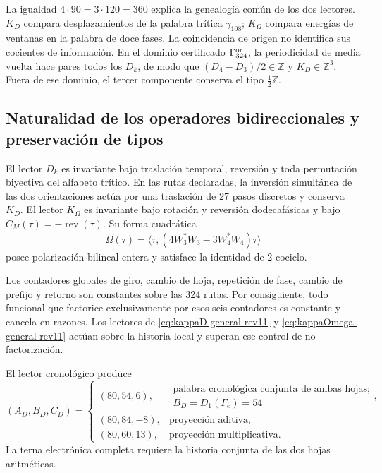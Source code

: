 La igualdad \(4\cdot90=3\cdot120=360\) explica la genealogía común de
los dos lectores. \(K_D\) compara desplazamientos de la palabra trítica
\(\gamma_{108}\);
\(K_\Omega\) compara energías de ventanas en la palabra de doce fases. La
coincidencia de origen no identifica sus cocientes de información.
En el dominio certificado \(\Gamma_{324}^{\rm or}\), la periodicidad de
media vuelta hace pares todos los \(D_k\), de modo que
\((D_4-D_3)/2\in\mathbb Z\) y \(K_D\in\mathbb Z^3\). Fuera de ese dominio,
el tercer componente conserva el tipo \(\tfrac12\mathbb Z\).

\subsection{Naturalidad de los operadores bidireccionales y preservación de tipos}

El lector \(D_k\) es invariante bajo traslación temporal, reversión y toda
permutación biyectiva del alfabeto trítico. En las rutas declaradas, la
inversión simultánea de las dos orientaciones actúa por una traslación de
27 pasos discretos y conserva \(K_D\). El lector \(K_\Omega\) es invariante bajo
rotación y reversión dodecafásicas y bajo
\(C_M(\tau)=-\operatorname{rev}(\tau)\). Su forma cuadrática
\[
 \Omega(\tau)=\langle\tau,
 (4W_3^*W_3-3W_4^*W_4)\tau\rangle
\]
posee polarización bilineal entera y satisface la identidad de 2-cociclo.

Los contadores globales de giro, cambio de hoja, repetición de fase, cambio de
prefijo y retorno son constantes sobre las 324 rutas. Por consiguiente, todo
funcional que factorice exclusivamente por esos seis contadores es constante
y cancela en razones. Los lectores de
\eqref{eq:kappaD-general-rev11} y
\eqref{eq:kappaOmega-general-rev11} actúan sobre la historia local y superan
ese control de no factorización.

\begin{ablation}
\label{abl:hojas-lector-two-way-rev11}
El lector cronológico produce
\[
 (A_D,B_D,C_D)=
 \begin{cases}
 (80,54,6),&\substack{\text{palabra cronológica conjunta de ambas hojas;}\\
 B_D=D_1(\Gamma_e)=54},\\
 (80,84,-8),&\text{proyección aditiva},\\
 (80,60,13),&\text{proyección multiplicativa}.
 \end{cases}
\]
La terna electrónica completa requiere la historia conjunta de las dos hojas
aritméticas.
\end{ablation}

